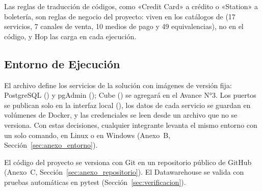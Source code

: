 Las reglas de traducción de códigos, como «Credit Card» a crédito o
«Station» a boletería, son reglas de negocio del proyecto: viven en los
catálogos de  (17 servicios, 7 canales de venta, 10 medios
de pago y 49 equivalencias), no en el código, y Hop las carga en cada
ejecución.


\subsection{Entorno de Ejecución}
\label{sec:entorno}

El archivo  define los servicios de la solución con
imágenes de versión fija: PostgreSQL () y pgAdmin
(); Cube () se agregará en
el Avance N°3. Los puertos se
publican solo en la interfaz local (), los datos de cada servicio
se guardan en volúmenes de Docker, y las credenciales se leen desde un archivo
 que no se versiona. Con estas decisiones, cualquier integrante
levanta el mismo entorno con un solo comando, en Linux o en Windows (Anexo~B,
Sección~\ref{sec:anexo_entorno}).

El código del proyecto se versiona con Git en un repositorio público de
GitHub (Anexo~C, Sección~\ref{sec:anexo_repositorio}). El Datawarehouse se
valida con pruebas automáticas en pytest (Sección~\ref{sec:verificacion}).

